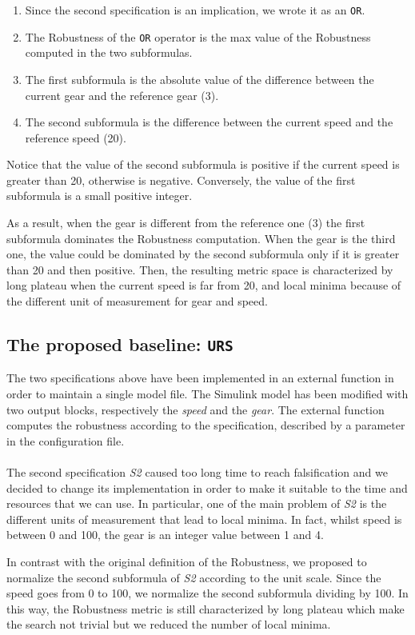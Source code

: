 \documentclass[11pt]{article}
\begin{document}
\begin{enumerate}
\item Since the second specification is an implication, we wrote it as an \texttt{OR}.
\item The Robustness of the \texttt{OR} operator is the max value of the Robustness computed in the two subformulas.
\item The first subformula is the absolute value of the difference between the current gear and the reference gear (3).
\item The second subformula is the difference between the current speed and the reference speed (20).
\end{enumerate}

Notice that the value of the second subformula is positive if the current speed is greater than 20, otherwise is negative. Conversely, the value of the first subformula is a small positive integer.

As a result, when the gear is different from the reference one (3) the first subformula dominates the Robustness computation. When the gear is the third one, the value could be dominated by     the second subformula only if it is greater than 20 and then positive. Then, the resulting metric space is characterized by long plateau when the current speed is far from 20, and local minima because of  the different unit of measurement for gear and speed.

\subsection{The proposed baseline: \texttt{URS}}
The two specifications above have been implemented in an external function in order to maintain a single model file. The Simulink model has been modified with two output blocks, respectively the \textit{speed} and the \textit{gear}. The external function computes the robustness according to the specification, described by a parameter in the configuration file.
\\ \\
The second specification \textit{S2} caused too long time to reach falsification and we decided to change its implementation in order to make it suitable to the time and resources that we can use. In particular, one of the main problem of \textit{S2} is the different units of measurement that lead to local minima. In fact, whilst speed is between 0 and 100, the gear is an integer value between 1 and 4.

In contrast with the original definition of the Robustness, we proposed to normalize the second subformula of \textit{S2} according to the unit scale. Since the speed goes from 0 to 100, we normalize the second subformula dividing by 100. In this way, the Robustness metric is still characterized by long plateau which make the search not trivial but we reduced the number of local minima.
\end{document}
